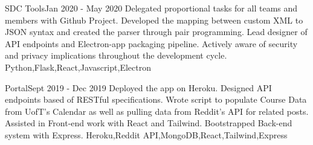 %
%
%


\begin{projects}
	\project
	{SDC Tools}{Jan 2020 - May 2020}
	{}
	{Delegated proportional tasks for all teams and members with Github Project. Developed the mapping between custom XML to JSON syntax and created the parser through pair programming. Lead designer of API endpoints and Electron-app packaging pipeline. Actively aware of security and privacy implications throughout the development cycle.}
	{Python,Flask,React,Javascript,Electron}
				
	\project
	{Portal}{Sept 2019 - Dec 2019}
	{ }
	{Deployed the app on Heroku. Designed API endpoints based of RESTful specifications. Wrote script to populate Course Data from UofT's Calendar as well as pulling data from Reddit's API for related posts. Assisted in Front-end work with React and Tailwind. Bootstrapped Back-end system with Express.}
	{Heroku,Reddit API,MongoDB,React,Tailwind,Express}

\end{projects}
